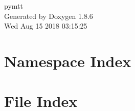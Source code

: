 \documentclass[twoside]{book}
\newcommand{\clearemptydoublepage}{%
  \newpage{\pagestyle{empty}\cleardoublepage}%
}
\begin{document}
\hypersetup{pageanchor=false}
\begin{titlepage}
\vspace*{7cm}
\begin{center}%
{\Large pymtt }\\
\vspace*{1cm}
{\large Generated by Doxygen 1.8.6}\\
\vspace*{0.5cm}
{\small Wed Aug 15 2018 03:15:25}\\
\end{center}
\end{titlepage}
\clearemptydoublepage
\tableofcontents
\clearemptydoublepage
{}
\hypersetup{pageanchor=true}

\chapter{Namespace Index}

\chapter{File Index}

\end{document}
